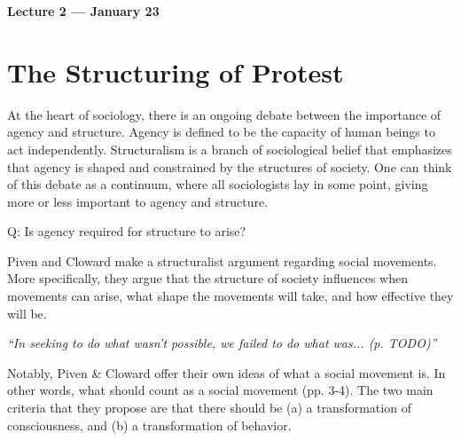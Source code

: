 
\vspace{3mm}
\noindent \textbf{Lecture 2 --- January 23\rd}

\section{The Structuring of Protest}
At the heart of sociology, there is an ongoing debate between the importance of agency and structure.
Agency is defined to be the capacity of human beings to act independently.
Structuralism is a branch of sociological belief that emphasizes that agency is shaped and constrained by the structures of society.
One can think of this debate as a continuum, where all sociologists lay in some point, giving more or less important to agency and structure.

\begin{center}
\end{center}

Q: Is agency required for structure to arise?

Piven and Cloward make a structuralist argument regarding social movements.
More specifically, they argue that the structure of society influences when movements can arise, what shape the movements will take, and how effective they will be.

\begin{center}
\textit{``In seeking to do what wasn't possible, we failed to do what was... (p. TODO)''}
\end{center}

Notably, Piven \& Cloward offer their own ideas of what a social movement is.
In other words, what should count as a social movement (pp. 3-4).
The two main criteria that they propose are that there should be (a) a transformation of consciousness, and (b) a transformation of behavior.

